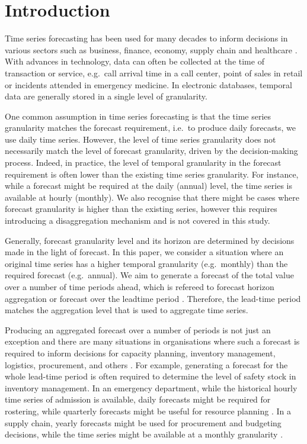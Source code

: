 \documentclass[]{elsarticle} %
\begin{document}
\hypertarget{introduction}{%
\section{Introduction}\label{introduction}}

Time series forecasting has been used for many decades to inform
decisions in various sectors such as business, finance, economy, supply
chain and healthcare \citep{petropoulos2022forecasting}. With advances
in technology, data can often be collected at the time of transaction or
service, e.g.~call arrival time in a call center, point of sales in
retail or incidents attended in emergency medicine. In electronic
databases, temporal data are generally stored in a single level of
granularity.

One common assumption in time series forecasting is that the time series
granularity matches the forecast requirement, i.e.~to produce daily
forecasts, we use daily time series. However, the level of time series
granularity does not necessarily match the level of forecast
granularity, driven by the decision-making process. Indeed, in practice,
the level of temporal granularity in the forecast requirement is often
lower than the existing time series granularity. For instance, while a
forecast might be required at the daily (annual) level, the time series
is available at hourly (monthly). We also recognise that there might be
cases where forecast granularity is higher than the existing series,
however this requires introducing a disaggregation mechanism and is not
covered in this study.

Generally, forecast granularity level and its horizon are determined by
decisions made in the light of forecast. In this paper, we consider a
situation where an original time series has a higher temporal
granularity (e.g.~monthly) than the required forecast (e.g.~annual). We
aim to generate a forecast of the total value over a number of time
periods ahead, which is refereed to forecast horizon aggregation or
forecast over the leadtime period \citep{mohammadipour2012forecast}.
Therefore, the lead-time period matches the aggregation level that is
used to aggregate time series.

Producing an aggregated forecast over a number of periods is not just an
exception and there are many situations in organisations where such a
forecast is required to inform decisions for capacity planning,
inventory management, logistics, procurement, and others
\citep[\citet{zotteri2007model}]{nikolopoulos2011aggregate}. For
example, generating a forecast for the whole lead-time period is often
required to determine the level of safety stock in inventory management.
In an emergency department, while the historical hourly time series of
admission is available, daily forecasts might be required for rostering,
while quarterly forecasts might be useful for resource planning
\citep{rostami2020anticipating}. In a supply chain, yearly forecasts
might be used for procurement and budgeting decisions, while the time
series might be available at a monthly granularity
\citep{mircetic2021forecasting}.
\end{document}
